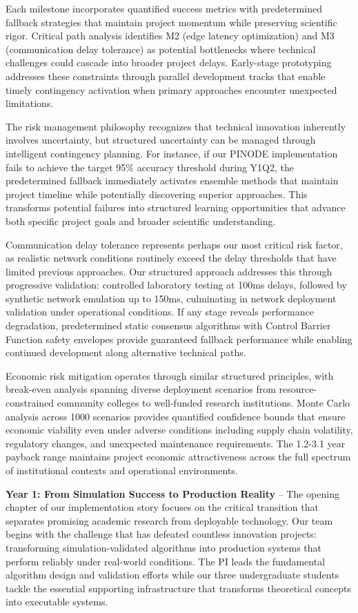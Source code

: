 \documentclass[12pt]{article}
\begin{document}
Each milestone incorporates quantified success metrics with predetermined fallback strategies that maintain project momentum while preserving scientific rigor. Critical path analysis identifies M2 (edge latency optimization) and M3 (communication delay tolerance) as potential bottlenecks where technical challenges could cascade into broader project delays. Early-stage prototyping addresses these constraints through parallel development tracks that enable timely contingency activation when primary approaches encounter unexpected limitations.

The risk management philosophy recognizes that technical innovation inherently involves uncertainty, but structured uncertainty can be managed through intelligent contingency planning. For instance, if our PINODE implementation fails to achieve the target 95\% accuracy threshold during Y1Q2, the predetermined fallback immediately activates ensemble methods that maintain project timeline while potentially discovering superior approaches. This transforms potential failures into structured learning opportunities that advance both specific project goals and broader scientific understanding.

Communication delay tolerance represents perhaps our most critical risk factor, as realistic network conditions routinely exceed the delay thresholds that have limited previous approaches. Our structured approach addresses this through progressive validation: controlled laboratory testing at 100ms delays, followed by synthetic network emulation up to 150ms, culminating in network deployment validation under operational conditions. If any stage reveals performance degradation, predetermined static consensus algorithms with Control Barrier Function safety envelopes provide guaranteed fallback performance while enabling continued development along alternative technical paths.

Economic risk mitigation operates through similar structured principles, with break-even analysis spanning diverse deployment scenarios from resource-constrained community colleges to well-funded research institutions. Monte Carlo analysis across 1000 scenarios provides quantified confidence bounds that ensure economic viability even under adverse conditions including supply chain volatility, regulatory changes, and unexpected maintenance requirements. The 1.2-3.1 year payback range maintains project economic attractiveness across the full spectrum of institutional contexts and operational environments.

\textbf{Year 1: From Simulation Success to Production Reality} – The opening chapter of our implementation story focuses on the critical transition that separates promising academic research from deployable technology. Our team begins with the challenge that has defeated countless innovation projects: transforming simulation-validated algorithms into production systems that perform reliably under real-world conditions. The PI leads the fundamental algorithm design and validation efforts while our three undergraduate students tackle the essential supporting infrastructure that transforms theoretical concepts into executable systems.
\end{document}
